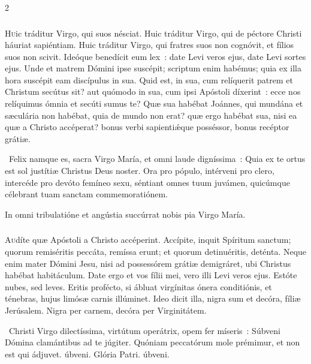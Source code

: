 \documentclass[9pt,twoside]{extarticle}
\begin{document}
\begin{multicols}{2}
\subsubsection*{\center {}}
\lettrine{H}uic tráditur Virgo, qui suos nésciat. Huic tráditur Virgo, qui de péctore Christi háuriat sapiéntiam. Huic tráditur Virgo, qui fratres suos non cognóvit, et fílios suos non scivit. Ideóque benedícit eum lex~: date Levi veros ejus, date Levi sortes ejus. Unde et matrem Dómini ipse suscépit; scriptum enim habémus; quia ex illa hora suscépit eam discípulus in sua. Quid est, in sua, cum relíquerit patrem et Christum secútus sit? aut quómodo in sua, cum ipsi Apóstoli díxerint~: ecce nos relíquimus ómnia et secúti sumus te? Quæ sua habébat Joánnes, qui mundána et sæculária non habébat, quia de mundo non erat? quæ ergo habébat sua, nisi ea quæ a Christo accéperat? bonus verbi sapientiǽque posséssor, bonus recéptor grátiæ.

\begin{tightlist}{}
\item {}~Felix namque es, sacra Virgo María, et omni laude digníssima~: \textred{*} Quia ex te ortus est sol justítiæ Christus Deus noster.
 Ora pro pópulo, intérveni pro clero, intercéde pro devóto femíneo sexu, séntiant omnes tuum juvámen, quicúmque célebrant tuam sanctam commemoratiónem.
\item {\small {} In omni tribulatióne et angústia succúrrat nobis pia Virgo María.}
\end{tightlist}

\subsubsection*{\center {}}
\lettrine{A}udíte quæ Apóstoli a Christo accéperint. Accípite, inquit Spíritum sanctum; quorum remiséritis peccáta, remíssa erunt; et quorum detinuéritis, deténta. Neque enim mater Dómini Jesu, nisi ad possessórem grátiæ demigráret, ubi Christus habébat habitáculum. Date ergo et vos fílii mei, vero illi Levi veros ejus. Estóte nubes, sed leves. Eritis profécto, si ábluat virgínitas ónera conditiónis, et ténebras, hujus limósæ carnis illúminet. Ideo dicit illa, nigra sum et decóra, fíliæ Jerúsalem. Nigra per carnem, decóra per Virginitátem.

\begin{tightlist}{}
\item {}~Christi Virgo dilectíssima, virtútum operátrix, opem fer míseris~: \textred{*} Súbveni Dómina clamántibus ad te júgiter.
 Quóniam peccatórum mole prémimur, et non est qui ádjuvet. úbveni. Glória Patri. úbveni.
\end{tightlist}


\end{multicols}
\end{document}
